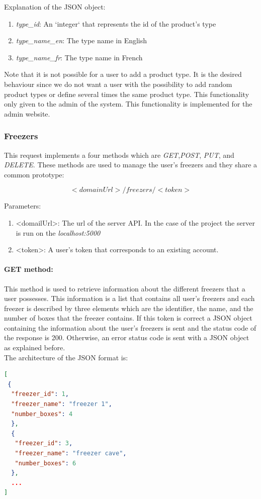 Explanation of the  JSON object:
\begin{enumerate}
\item \textit{type\_id}: An `integer` that represents the id of the product's type
\item \textit{type\_name\_en}: The type name in English
\item \textit{type\_name\_fr}: The type name in French
\end{enumerate}

Note that it is not possible for a user to add a product type. It is the desired behaviour since we do not want a user with the possibility to add random product types or define several times the same product type. This functionality only given to the admin of the system. This functionality is implemented for the admin website.

\subsubsection{Freezers}
This request implements a four methods which are \textit{GET},\textit{POST}, \textit{PUT}, and \textit{DELETE}. These methods are used to manage the user's freezers and they share a common prototype:

$$<domainUrl>/freezers/<token>$$

Parameters:
\begin{enumerate}
\item <domailUrl>: The url of the server API. In the case of the project the server is run on the \textit{localhost:5000}
\item <token>: A user's token that corresponds to an existing account.
\end{enumerate}

\paragraph{GET method:} This method is used to retrieve information about the different freezers that a user possesses. This information is a list that contains all user's freezers and each freezer is described by three elements which are the identifier, the name, and the number of boxes that the freezer contains. If this token is correct a JSON object containing the information about the user's freezers is sent and the status code of the response is 200. Otherwise, an error status code is sent with a JSON object as explained before.\\

The architecture of the JSON format is:
\begin{lstlisting}[language=json]
[
 {
  "freezer_id": 1,
  "freezer_name": "freezer 1",
  "number_boxes": 4
  },
  {
   "freezer_id": 3,
   "freezer_name": "freezer cave",
   "number_boxes": 6
  },
  ...
]
\end{lstlisting}

